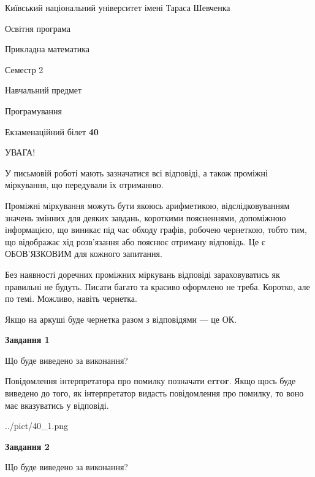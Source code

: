 \documentclass[12pt, ukrainian]{article}
\begin{document}
{{\begin {small}\par
{ \center  Київський національний університет імені Тараса Шевченка \par}
{\parbox {5 cm}{Освітня програма \hfill}{\parbox {7 cm}{Прикладна математика \hfill}}\parbox {6 cm}{\hfill Семестр 2}}\par
{\parbox {5 cm} {Навчальний предмет \hfill}\parbox {7 cm}{Програмування \hfill}\parbox {6cm}{\hfill}\par}\vspace{-7pt} \end{small}}{\center Екзаменаційний білет \No \textbf
{ 40 }\par}}
{
\begin {large}
УВАГА!

У письмовій роботі мають зазначатися всі відповіді, а також проміжні міркування, що передували їх отриманню.

Проміжні міркування можуть бути якоюсь арифметикою, відслідковуванням зна\-чень змінних для деяких завдань,
короткими поясненнями, допоміжною інформацією, що виникає під час обходу графів, робочею чернеткою,
тобто тим, що відображає хід розв’язання або пояснює отриману відповідь.
Це є ОБОВ’ЯЗКОВИМ для кожного запитання.

Без наявності доречних проміжних міркувань відповіді зараховуватись як правиль\-ні не будуть.
Писати багато та красиво оформлено не треба. Коротко, але по темі. Можли\-во, навіть чернетка.

Якщо на аркуші буде чернетка разом з відповідями --- це ОК.

\newpage

{\begin {center}\textbf{Завдання 1}\end {center}}\par
Що буде виведено за виконання?

Повідомлення інтерпретатора про помилку позначати \textbf{error}.
Якщо щось буде виведено до того, як інтерпретатор видасть повідомлення про помилку, 
то воно має вказуватись у відповіді. \par


\begin{center}
	{../pict/40_1.png}
\end{center}
\newpage

{\begin {center}\textbf{Завдання 2}\end {center}}\par
Що буде виведено за виконання?


\end{large}}
\end{document}
